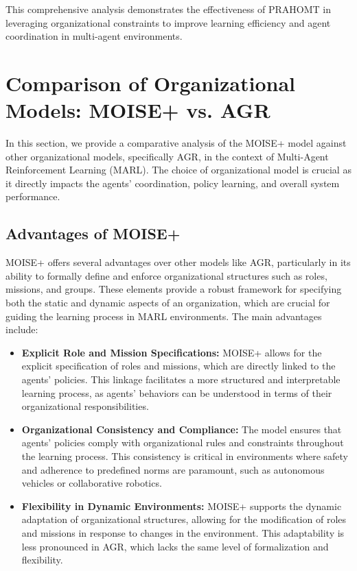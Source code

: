 \documentclass[sigconf,anonymous]{aamas}
\begin{document}
This comprehensive analysis demonstrates the effectiveness of PRAHOMT in leveraging organizational constraints to improve learning efficiency and agent coordination in multi-agent environments.




\section{Comparison of Organizational Models: MOISE+ vs. AGR}
\label{sec:comparison_organizational_models}

In this section, we provide a comparative analysis of the MOISE+ model against other organizational models, specifically AGR, in the context of Multi-Agent Reinforcement Learning (MARL). The choice of organizational model is crucial as it directly impacts the agents' coordination, policy learning, and overall system performance.

\subsection{Advantages of MOISE+}
MOISE+ offers several advantages over other models like AGR, particularly in its ability to formally define and enforce organizational structures such as roles, missions, and groups. These elements provide a robust framework for specifying both the static and dynamic aspects of an organization, which are crucial for guiding the learning process in MARL environments. The main advantages include:
\begin{itemize}
    \item \textbf{Explicit Role and Mission Specifications:} MOISE+ allows for the explicit specification of roles and missions, which are directly linked to the agents' policies. This linkage facilitates a more structured and interpretable learning process, as agents' behaviors can be understood in terms of their organizational responsibilities.
    \item \textbf{Organizational Consistency and Compliance:} The model ensures that agents’ policies comply with organizational rules and constraints throughout the learning process. This consistency is critical in environments where safety and adherence to predefined norms are paramount, such as autonomous vehicles or collaborative robotics.
    \item \textbf{Flexibility in Dynamic Environments:} MOISE+ supports the dynamic adaptation of organizational structures, allowing for the modification of roles and missions in response to changes in the environment. This adaptability is less pronounced in AGR, which lacks the same level of formalization and flexibility.
\end{itemize}
\end{document}
